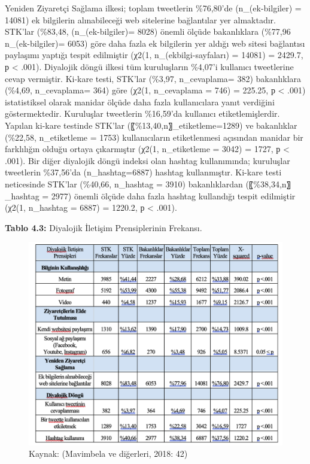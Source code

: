 \documentclass[
]{book}
\begin{document}
Yeniden Ziyaretçi Sağlama ilkesi; toplam tweetlerin \%76,80'de (n\_(ek-bilgiler) = 14081) ek bilgilerin alınabileceği web sitelerine bağlantılar yer almaktadır. STK'lar (\%83,48, (n\_(ek-bilgiler)= 8028) önemli ölçüde bakanlıklara (\%77,96 n\_(ek-bilgiler)= 6053) göre daha fazla ek bilgilerin yer aldığı web sitesi bağlantısı paylaşımı yaptığı tespit edilmiştir (χ2(1, n\_(ekbilgi-sayfaları) = 14081) = 2429.7, р \textless{} .001).
Diyalojik döngü ilkesi tüm kuruluşların \%4,07'i kullanıcı tweetlerine cevap vermiştir. Ki-kare testi, STK'lar (\%3,97, n\_cevaplama= 382) bakanlıklara (\%4,69, n\_cevaplama= 364) göre (χ2(1, n\_cevaplama = 746) = 225.25, р \textless{} .001) istatistiksel olarak manidar ölçüde daha fazla kullanıcılara yanıt verdiğini göstermektedir. Kuruluşlar tweetlerin \%16,59'da kullanıcı etiketlemişlerdir. Yapılan ki-kare testinde STK'lar (〖\%13,40,n〗\_etiketleme=1289) ve bakanlıklar (\%22,58, n\_etiketleme = 1753) kullanıcıların etiketlenmesi açısından manidar bir farklılığın olduğu ortaya çıkarmıştır (χ2(1, n\_etiketleme = 3042) = 1727, р \textless{} .001). Bir diğer diyalojik döngü indeksi olan hashtag kullanımında; kuruluşlar tweetlerin \%37,56'da (n\_hashtag=6887) hashtag kullanmıştır. Ki-kare testi neticesinde STK'lar (\%40,66, n\_hashtag = 3910) bakanlıklardan (〖\%38,34,n〗\_hashtag = 2977) önemli ölçüde daha fazla hashtag kullandığı tespit edilmiştir (χ2(1, n\_hashtag = 6887) = 1220.2, р \textless{} .001).

\textbf{Tablo 4.3:} Diyalojik İletişim Prensiplerinin Frekansı.

\begin{figure}
\includegraphics[width=0.95\linewidth,height=0.95\textheight]{tablolar-sekiller/tablo-4-3} \caption{Kaynak: (Mavimbela ve diğerleri, 2018: 42)}\label{fig:unnamed-chunk-7}
\end{figure}
\end{document}
